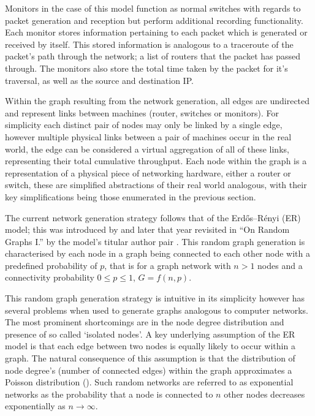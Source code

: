 Monitors in the case of this model function as normal switches with regards to packet generation and reception but perform additional recording functionality. Each monitor stores information pertaining to each packet which is generated or received by itself. This stored information is analogous to a traceroute of the packet's path through the network; a list of routers that the packet has passed through. The monitors also store the total time taken by the packet for it’s traversal, as well as the source and destination IP.\par
Within the graph resulting from the network generation, all edges are undirected and represent links between machines (router, switches or monitors). For simplicity each distinct pair of nodes may only be linked by a single edge, however multiple physical links between a pair of machines occur in the real world, the edge can be considered a virtual aggregation of all of these links, representing their total cumulative throughput. Each node within the graph is a representation of a physical piece of networking hardware, either a router or switch, these are simplified abstractions of their real world analogous, with their key simplifications being those enumerated in the previous section.\par
The current network generation strategy follows that of the Erdős–Rényi (ER) model; this was introduced by \cite{gilbert_random_1961} and later that year revisited in “On Random Graphs I.” by the model’s titular author pair \cite{erdos_random_1959}. This random graph generation is characterised by each node in a graph being connected to each other node with a predefined probability of $p$, that is for a graph \gls{network} with $n>1$ nodes and a connectivity probability $0\leq p\leq 1$, $G=f(n,p)$.\par
This random graph generation strategy is intuitive in its simplicity however has several problems when used to generate graphs analogous to computer networks. The most prominent shortcomings are in the node degree distribution and presence of so called ‘isolated nodes’. A key underlying assumption of the ER model is that each edge between two nodes is equally likely to occur within a graph. The natural consequence of this assumption is that the distribution of node degree’s (number of connected edges) within the graph approximates a Poisson distribution (\cite{albert-laszlo_scale-free_2003}). Such random networks are referred to as exponential networks as the probability that a node is connected to $n$ other nodes decreases exponentially as $n\to\infty$.\par
